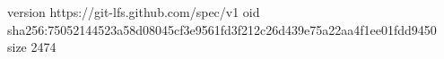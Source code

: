 version https://git-lfs.github.com/spec/v1
oid sha256:75052144523a58d08045cf3e9561fd3f212c26d439e75a22aa4f1ee01fdd9450
size 2474
